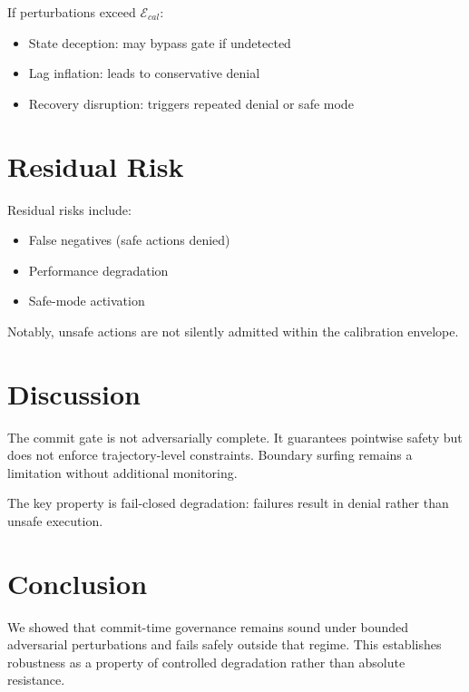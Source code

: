 \documentclass[letterpaper, 10 pt, conference]{ieeeconf}
\begin{document}
\begin{proposition}
If perturbations exceed $\mathcal{E}_{cal}$:
\begin{itemize}
\item State deception: may bypass gate if undetected
\item Lag inflation: leads to conservative denial
\item Recovery disruption: triggers repeated denial or safe mode
\end{itemize}
\end{proposition}

\section{Residual Risk}

Residual risks include:
\begin{itemize}
\item False negatives (safe actions denied)
\item Performance degradation
\item Safe-mode activation
\end{itemize}

Notably, unsafe actions are not silently admitted within the calibration envelope.

\section{Discussion}

The commit gate is not adversarially complete. It guarantees pointwise safety but does not enforce trajectory-level constraints. Boundary surfing remains a limitation without additional monitoring.

The key property is fail-closed degradation: failures result in denial rather than unsafe execution.

\section{Conclusion}

We showed that commit-time governance remains sound under bounded adversarial perturbations and fails safely outside that regime. This establishes robustness as a property of controlled degradation rather than absolute resistance.
\end{document}

